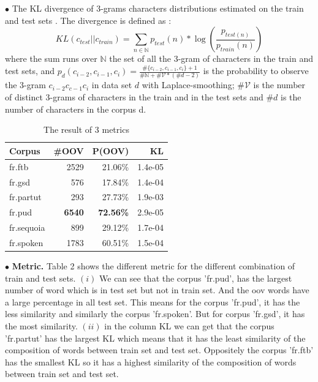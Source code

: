 \documentclass{article}
\def\NN{{\mathbb{N}}}
\def\VV{{\mathcal{V}}}
\begin{document}
$\bullet$ The KL divergence of 3-grams characters distributions estimated on the train and test sets \cite{alonso2016noisy}. The divergence is defined as :
$$KL(c_{test}||c_{train}) = \sum_{n \in \NN} p_{test}(n)*\log(\frac{p_{test(n)}}{p_{train}(n)})$$ 
where the sum runs over $\NN$ the set of all the 3-gram of characters in the train and test sets, and $p_d(c_{i-2},c_{i-1},c_i) = \frac{\#\{c_{i-2},c_{i-1},c_{i}\} + 1}{\#\NN+\#\VV*(\#d-2)}$ is the probability to observe the 3-gram $c_{i-2}c_{c-1}c_{i}$ in data set $d$ with Laplace-smoothing; $\#\VV$ is the number of distinct 3-grams of characters in the train and in the test sets and $\#d$ is the number of characters in the corpus d.


\begin{table}[h]
    \caption{The result of 3 metrics}
    \vspace{5pt}
    \centering
    
\begin{tabular}{|l|rr|r|}
\hline
Corpus & \#OOV & P(OOV) & KL \\
\hline
fr.ftb     & 2529 & 21.06\% & 1.4e-05 \\
fr.gsd     & 576 & 17.84\% & 1.4e-04  \\
fr.partut  & 293   & 27.73\%  & 1.9e-03  \\
fr.pud     & \textbf{6540}   & \textbf{72.56\%}  & 2.9e-05\\
fr.sequoia & 899  & 29.12\%  &  1.7e-04 \\
fr.spoken  & 1783  & 60.51\%  & 1.5e-04  \\
\hline
\end{tabular}
\label{table_matric}
\end{table}

$\bullet$ \textbf{Metric.} Table 2 shows the different metric for the different combination of train and test sets. $(i)$ We can see that the corpus 'fr.pud', has the largest number of word which is in test set but not in train set. And the oov words have a large percentage in all test set. This means for the corpus 'fr.pud', it has the less similarity and similarly the corpus 'fr.spoken'. But for corpus 'fr.gsd', it has the most similarity. $(ii)$ in the column KL we can get that the corpus 'fr.partut' has the largest KL which means that it has the least similarity of the composition of words between train set and test set. Oppositely the corpus 'fr.ftb' has the smallest KL so it has a highest similarity of the composition of words between train set and test set.
\end{document}
